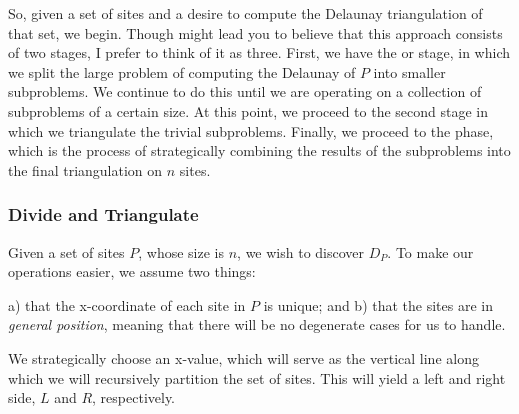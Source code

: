 \documentclass[12pt,twoside]{reedthesis}
\begin{document}
    So, given a set of sites and a desire to compute the Delaunay triangulation of that set, we begin. Though  might lead you to believe that this approach consists of two stages, I prefer to think of it as three. First, we have the  or  stage, in which we split the large problem of computing the Delaunay of $P$ into smaller subproblems. We continue to do this until we are operating on a collection of subproblems of a certain size. At this point, we proceed to the second stage in which we triangulate the trivial subproblems. Finally, we proceed to the  phase, which is the process of strategically combining the results of the subproblems into the final triangulation on $n$ sites. 


  \subsubsection{Divide and Triangulate}
  \label{subsub:Divide}
    Given a set of sites $P$, whose size is $n$, we wish to discover $D_{P}$. To make our operations easier, we assume two things: \begin{inparaenum}a) that the x-coordinate of each site in $P$ is unique; and b) that the sites are in \emph{general position}, meaning that there will be no degenerate cases for us to handle.\end{inparaenum} We strategically choose an x-value, which will serve as the vertical line along which we will recursively partition the set of sites. This will yield a left and right side, $L$ and $R$, respectively.\par
\end{document}
